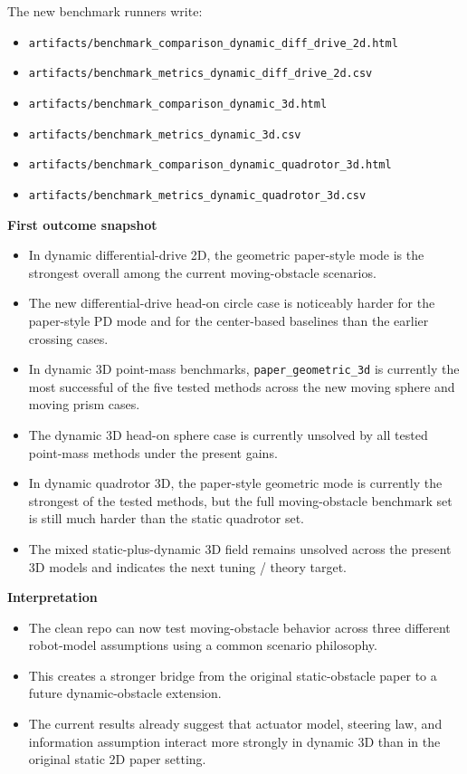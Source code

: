 \documentclass[11pt]{article}
\begin{document}
The new benchmark runners write:
\begin{itemize}[leftmargin=*]
  \item \texttt{artifacts/benchmark\_comparison\_dynamic\_diff\_drive\_2d.html}
  \item \texttt{artifacts/benchmark\_metrics\_dynamic\_diff\_drive\_2d.csv}
  \item \texttt{artifacts/benchmark\_comparison\_dynamic\_3d.html}
  \item \texttt{artifacts/benchmark\_metrics\_dynamic\_3d.csv}
  \item \texttt{artifacts/benchmark\_comparison\_dynamic\_quadrotor\_3d.html}
  \item \texttt{artifacts/benchmark\_metrics\_dynamic\_quadrotor\_3d.csv}
\end{itemize}

\textbf{First outcome snapshot}

\begin{itemize}[leftmargin=*]
  \item In dynamic differential-drive 2D, the geometric paper-style mode is the strongest overall among the current moving-obstacle scenarios.
  \item The new differential-drive head-on circle case is noticeably harder for the paper-style PD mode and for the center-based baselines than the earlier crossing cases.
  \item In dynamic 3D point-mass benchmarks, \texttt{paper\_geometric\_3d} is currently the most successful of the five tested methods across the new moving sphere and moving prism cases.
  \item The dynamic 3D head-on sphere case is currently unsolved by all tested point-mass methods under the present gains.
  \item In dynamic quadrotor 3D, the paper-style geometric mode is currently the strongest of the tested methods, but the full moving-obstacle benchmark set is still much harder than the static quadrotor set.
  \item The mixed static-plus-dynamic 3D field remains unsolved across the present 3D models and indicates the next tuning / theory target.
\end{itemize}

\textbf{Interpretation}

\begin{itemize}[leftmargin=*]
  \item The clean repo can now test moving-obstacle behavior across three different robot-model assumptions using a common scenario philosophy.
  \item This creates a stronger bridge from the original static-obstacle paper to a future dynamic-obstacle extension.
  \item The current results already suggest that actuator model, steering law, and information assumption interact more strongly in dynamic 3D than in the original static 2D paper setting.
\end{itemize}
\end{document}
